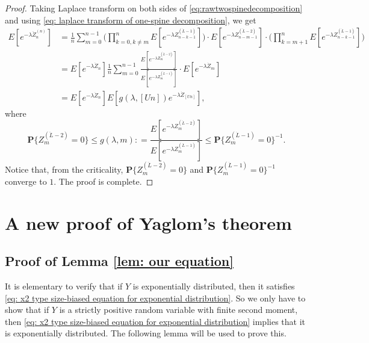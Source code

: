\documentclass[12pt,a4paper]{amsart}
\numberwithin{equation}{section}
\begin{document}
\begin{proof}
Taking Laplace transform on both sides of \eqref{eq:rawtwospinedecomposition}  and using \eqref{eq: laplace transform of one-spine decomposition}, we get
\begin{equation} \label{eq:laplacetransformationoftwospinedecomposition} \begin{split}
	E [ e^{- \lambda \ddot Z_n^{(n)}} ]
	&= \frac{1}{n}\sum_{m=0}^{n-1} \Big( \prod_{k=0,k\neq m}^{n} E[e^{-\lambda Z^{(\dot L - 1)}_{n-k-1}}] \Big) \cdot E [e^{-\lambda Z^{(\ddot L - 2)}_{n-m-1}}] \cdot \Big(\prod_{k= m+1}^n E [e^{-\lambda Z^{(\dot L - 1)}_{n-k-1}}]\Big)
	\\&= E [e^{-\lambda \dot Z_n}]  \frac{1}{n}\sum_{m=0}^{n-1}   \frac{ E [e^{-\lambda Z^{(\ddot L - 2)}_{m}}] }{ E[e^{-\lambda Z^{(\dot L - 1)}_{m}}] } \cdot E[e^{- \lambda \dot Z_{m}}]
	\\&= E [e^{-\lambda \dot Z_n}] E[g(\lambda, [Un])e^{-\lambda \dot Z_{[Un]}}],
\end{split}
\end{equation}
	where 
\[
	\mathbf P\{Z^{(\ddot L - 2)}_m=0\}
	\leq	g(\lambda,m) 
	: = \frac{ E [e^{-\lambda Z^{(\ddot L - 2)}_{m}}] }{ E[e^{-\lambda Z^{(\dot L - 1)}_{m}}] }
	\leq \mathbf P\{Z^{(\dot L - 1)}_m = 0\}^{-1}.
\]
	Notice that, from the criticality, $\mathbf P\{Z^{(\ddot L - 2)}_m=0\}$ and 
	$\mathbf P\{Z^{(\dot L - 1)}_m = 0\}^{-1}$ converge to $1$. 
	The proof is complete.
\end{proof}


\section{A new proof of Yaglom's theorem}
\label{sec:anewproofofyaglomslaw}

\subsection{Proof of Lemma \ref{lem: our equation}}
\label{sec: proof of our equation}

	It is elementary to verify that if $Y$ is exponentially distributed, then it satisfies \eqref{eq: x2 type size-biased equation for exponential distribution}.
	So we only have to show that if $Y$ is a strictly positive random variable with finite second moment, then \eqref{eq: x2 type size-biased equation for exponential distribution} implies that it is exponentially distributed.
	The following lemma will be used to prove this.
\end{document}

